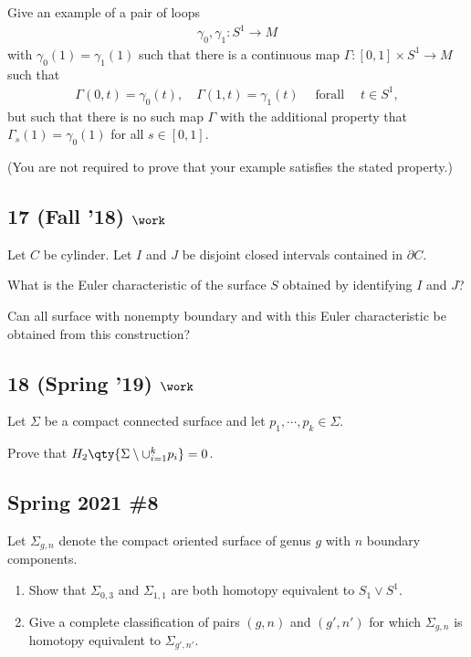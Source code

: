 Give an example of a pair of loops
\begin{align*}\gamma_0 , \gamma_1 : S^1 \to M\end{align*}
with \(\gamma_0 (1) = \gamma_1 (1)\) such that there is a continuous map
\(\Gamma: [0, 1] \times S^1 \to M\) such that
\begin{align*}
\Gamma(0, t) = \gamma_0 (t), \quad \Gamma(1, t) = \gamma_1 (t) {\quad \operatorname{for all} \quad} t \in S^1
,\end{align*}
but such that there is no such map \(\Gamma\) with the additional
property that \(\Gamma_s (1) = \gamma_0 (1)\) for all \(s \in [0, 1]\).

(You are not required to prove that your example satisfies the stated
property.)

\hypertarget{fall-18-work-8}{%
\subsection{\texorpdfstring{17 (Fall '18)
\(\work\)}{17 (Fall '18) \textbackslash work}}\label{fall-18-work-8}}

Let \(C\) be cylinder. Let \(I\) and \(J\) be disjoint closed intervals
contained in \(\partial C\).

What is the Euler characteristic of the surface \(S\) obtained by
identifying \(I\) and \(J\)?

Can all surface with nonempty boundary and with this Euler
characteristic be obtained from this construction?

\hypertarget{spring-19-work-2}{%
\subsection{\texorpdfstring{18 (Spring '19)
\(\work\)}{18 (Spring '19) \textbackslash work}}\label{spring-19-work-2}}

Let \(\Sigma\) be a compact connected surface and let
\(p_1, \cdots , p_k \in \Sigma\).

Prove that \(H_2 \qty{\Sigma \setminus \cup_{i=1}^k {p_i} } = 0\).

\hypertarget{spring-2021-8}{%
\subsection{Spring 2021 \#8}\label{spring-2021-8}}

\begin{problem}[Spring 2021, 8]

Let \(\Sigma_{g, n}\) denote the compact oriented surface of genus \(g\)
with \(n\) boundary components.

\begin{enumerate}
\def\labelenumi{\alph{enumi}.}
\item
  Show that \(\Sigma_{0, 3}\) and \(\Sigma_{1, 1}\) are both homotopy
  equivalent to \(S_1 \vee S^1\).
\item
  Give a complete classification of pairs \((g, n)\) and \((g', n')\)
  for which \(\Sigma_{g, n}\) is homotopy equivalent to
  \(\Sigma_{g', n'}\).
\end{enumerate}

\end{problem}

